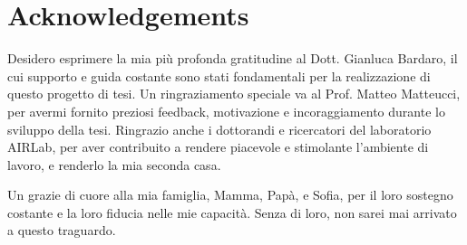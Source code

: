 \documentclass{headers/polimi_3i}
\begin{document}

\mainmatter %









\thispagestyle{empty}
\cleardoublepage

\setlength{}
\printbibliography



\cleardoublepage

\listoffigures

\listoftables

\listofalgorithms

\chapter*{Acknowledgements}
Desidero esprimere la mia più profonda gratitudine al Dott. Gianluca Bardaro, il cui supporto e guida costante sono
stati fondamentali per la realizzazione di questo progetto di tesi. Un ringraziamento speciale va al Prof. Matteo Matteucci, per 
avermi fornito preziosi feedback, motivazione e incoraggiamento durante lo sviluppo della tesi.
Ringrazio anche i dottorandi e ricercatori del laboratorio AIRLab, per aver contribuito a rendere piacevole e stimolante
l'ambiente di lavoro, e renderlo la mia seconda casa.

Un grazie di cuore alla mia famiglia, Mamma, Papà, e Sofia, per il loro sostegno costante e la loro fiducia nelle mie capacità. 
Senza di loro, non sarei mai arrivato a questo traguardo.
\end{document}

